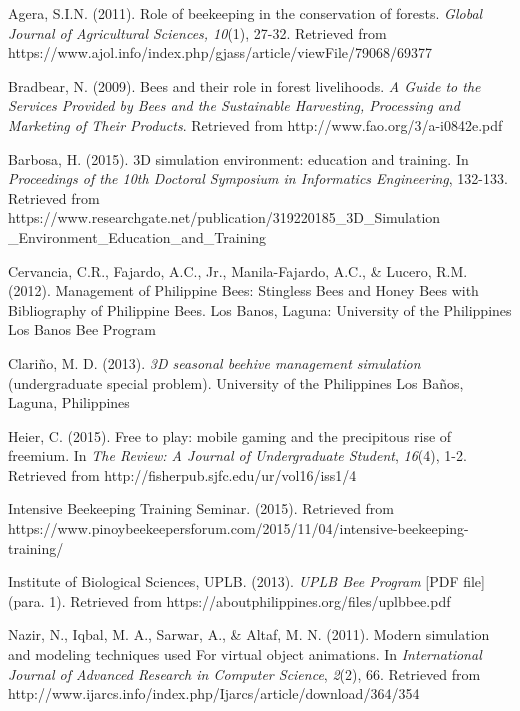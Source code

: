 \documentclass[journal]{./IEEE/IEEEtran}
\begin{document}

%
\begin{thebibliography}{13}

Agera, S.I.N. (2011). Role of beekeeping in the conservation of forests. \textit{Global Journal of Agricultural Sciences, 10}(1), 27-32. Retrieved from https://www.ajol.info/index.php/gjass/article/viewFile/79068/69377

Bradbear, N. (2009). Bees and their role in forest livelihoods. \textit{A Guide to the Services Provided by Bees and the Sustainable Harvesting, Processing and Marketing of Their Products}. Retrieved from http://www.fao.org/3/a-i0842e.pdf

Barbosa, H. (2015). 3D simulation environment: education and training. In \textit{Proceedings of the 10th Doctoral Symposium in Informatics Engineering}, 132-133. Retrieved from https://www.researchgate.net/publication/319220185\_3D\_Simulation
\newline\_Environment\_Education\_and\_Training
    
Cervancia, C.R., Fajardo, A.C., Jr., Manila-Fajardo, A.C., \& Lucero, R.M. (2012). Management of Philippine Bees: Stingless Bees and Honey Bees with Bibliography of Philippine Bees. Los Banos, Laguna: University of the Philippines Los Banos Bee Program

Clari\~{n}o, M. D. (2013). \textit{3D seasonal beehive management simulation} (undergraduate special problem). University of the Philippines Los Baños, Laguna, Philippines

Heier, C. (2015). Free to play: mobile gaming and the precipitous rise of freemium. In \textit{The Review: A Journal of Undergraduate Student}, \textit{16}(4), 1-2. Retrieved from http://fisherpub.sjfc.edu/ur/vol16/iss1/4

Intensive Beekeeping Training Seminar. (2015). Retrieved from https://www.pinoybeekeepersforum.com/2015/11/04/intensive-beekeeping-training/

Institute of Biological Sciences, UPLB. (2013). \textit{UPLB Bee Program} [PDF file] (para. 1). Retrieved from https://aboutphilippines.org/files/uplbbee.pdf

Nazir, N., Iqbal, M. A., Sarwar, A., & Altaf, M. N. (2011). Modern simulation and modeling techniques used For virtual object animations. In \textit{International Journal of Advanced Research in Computer Science}, \textit{2}(2), 66. Retrieved from http://www.ijarcs.info/index.php/Ijarcs/article/download/364/354


\end{thebibliography}
\end{document}
